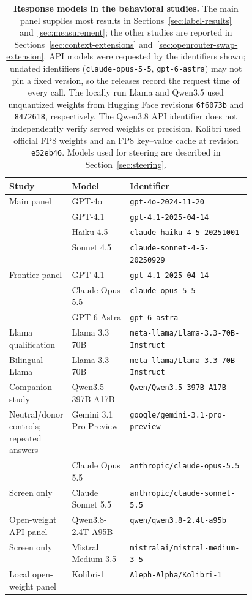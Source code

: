 \documentclass[11pt]{article}
\begin{document}
\begin{table}[!htb]
\centering\small
\caption{\textbf{Response models in the behavioral studies.} The main panel
supplies most results in Sections~\ref{sec:label-results}
and~\ref{sec:measurement}; the other studies are reported in
Sections~\ref{sec:context-extensions} and~\ref{sec:openrouter-swap-extension}.
API models were requested by the identifiers shown; undated identifiers
(\texttt{claude-opus-5-5}, \texttt{gpt-6-astra}) may not pin a fixed version,
so the releases record the request time of every call. The locally run Llama
and Qwen3.5 used unquantized weights from Hugging Face revisions
\texttt{6f6073b} and \texttt{8472618}, respectively. The Qwen3.8 API identifier
does not independently verify served weights or precision. Kolibri used
official FP8 weights and an FP8 key--value cache at revision
\texttt{e52eb46}. Models used for steering are described in
Section~\ref{sec:steering}.}
\label{tab:models}
\begin{tabularx}{\linewidth}{@{}p{0.22\linewidth}p{0.24\linewidth}X@{}}
\toprule
Study & Model & Identifier\\
\midrule
Main panel & GPT-4o & \texttt{gpt-4o-2024-11-20}\\
 & GPT-4.1 & \texttt{gpt-4.1-2025-04-14}\\
 & Haiku 4.5 & \texttt{claude-haiku-4-5-20251001}\\
 & Sonnet 4.5 & \texttt{claude-sonnet-4-5-20250929}\\
\addlinespace
Frontier panel & GPT-4.1 & \texttt{gpt-4.1-2025-04-14}\\
 & Claude Opus 5.5 & \texttt{claude-opus-5-5}\\
 & GPT-6 Astra & \texttt{gpt-6-astra}\\
\addlinespace
Llama qualification & Llama 3.3 70B & \texttt{meta-llama/Llama-3.3-70B-Instruct}\\
Bilingual Llama & Llama 3.3 70B & \texttt{meta-llama/Llama-3.3-70B-Instruct}\\
\addlinespace
Companion study & Qwen3.5-397B-A17B & \texttt{Qwen/Qwen3.5-397B-A17B}\\
\addlinespace
Neutral/donor controls; repeated answers & Gemini 3.1 Pro Preview & \texttt{google/gemini-3.1-pro-preview}\\
 & Claude Opus 5.5 & \texttt{anthropic/claude-opus-5.5}\\
Screen only & Claude Sonnet 5.5 & \texttt{anthropic/claude-sonnet-5.5}\\
\addlinespace
Open-weight API panel & Qwen3.8-2.4T-A95B & \texttt{qwen/qwen3.8-2.4t-a95b}\\
Screen only & Mistral Medium 3.5 & \texttt{mistralai/mistral-medium-3-5}\\
Local open-weight panel & Kolibri-1 & \texttt{Aleph-Alpha/Kolibri-1}\\
\bottomrule
\end{tabularx}
\end{table}
\end{document}
